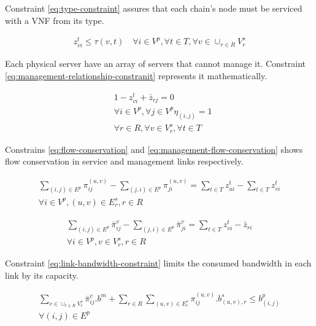 Constraint \ref{eq:type-constraint} assures that each chain's node must be serviced with a VNF from its type.

\begin{align}\label{eq:type-constraint}
    z_{vi}^{t} \le \tau(v, t)
    \quad
    \forall i \in V^p,
    \forall t \in T,
    \forall v \in \cup_{r \in R} V^s_r
\end{align}

Each physical server have an array of servers that cannot manage it.
Constraint \ref{eq:management-relationship-constranit} represents it mathematically.

\begin{align}\label{eq:management-relationship-constranit}
    & 1 - z_{vi}^t + \bar{z}_{rj} = 0 \nonumber \\
    & \forall i \in V^p,
    \forall j \in V^p \eta_{(i, j)} = 1 \nonumber \\
    & \forall r \in R,
    \forall v \in V^s_r,
    \forall t \in T
\end{align}

Constrains \ref{eq:flow-conservation} and \ref{eq:management-flow-conservation} shows flow conservation in service and management links respectively.

\begin{align}\label{eq:flow-conservation}
    \sum_{(i,j) \in E^p} \pi_{ij}^{(u,v)} - \sum_{(j,i) \in E^p} \pi_{ji}^{(u,v)} = \sum_{t \in T} z_{ui}^{t} - \sum_{t \in T} z_{vi}^{t} \nonumber \\
    \forall i \in V^p, (u,v) \in E^s_r, r \in R
\end{align}

\begin{align}\label{eq:management-flow-conservation}
    \sum_{(i,j) \in E^p} \bar{\pi}_{ij}^{v} - \sum_{(j,i) \in E^p} \bar{\pi}_{ji}^{v} = \sum_{t \in T} z_{vi}^{t} - \bar{z}_{ri} \nonumber \\
    \forall i \in V^p, v \in V^s_r, r \in R
\end{align}

Constraint \ref{eq:link-bandwidth-constraint} limits the consumed bandwidth in each link by its capacity.

\begin{align}\label{eq:link-bandwidth-constraint}
    \sum_{v \in \cup_{r \in R} V^s_r} \bar{\pi}_{ij}^{v} . b^m + \sum_{r \in R}\sum_{(u, v) \in E^s_r} \pi_{ij}^{(u,v)} . b^s_{(u, v), r} \le b^p_{(i,j)} \nonumber \\
    \forall (i, j) \in E^p
\end{align}

